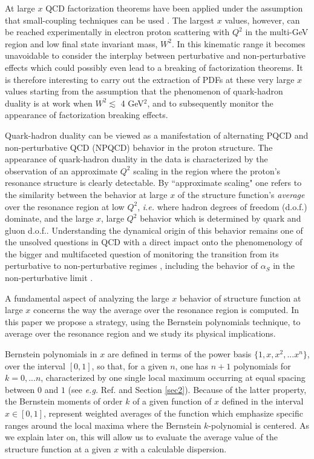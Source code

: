 \documentclass[
twocolumn,
aps,prd,
nofootinbib,
superscriptaddress,
showpacs,ligh
tightenlines, 
]{revtex4}
\begin{document}
At large $x$ QCD factorization theorems have been  applied under the assumption that 
small-coupling techniques can be used \cite{Moffat:2017sha}. The largest  $x$ values, however, can be reached experimentally in electron proton scattering with $Q^2$ in the multi-GeV region and low final state invariant mass, $W^2$. In this kinematic
range it becomes unavoidable to consider the interplay between perturbative and non-perturbative effects which could possibly even lead to a breaking of factorization theorems.  
It is therefore interesting to carry out the extraction of PDFs at these very large $x$ values starting from the
assumption that the phenomenon of quark-hadron duality is at work when $W^2 \lesssim$ 4 GeV$^2$, and to subsequently monitor the appearance of factorization breaking effects. 

Quark-hadron duality can be viewed as a manifestation of alternating
PQCD and non-perturbative QCD (NPQCD) behavior in the proton structure. 
%
The appearance of quark-hadron duality in the data is characterized by the observation of an approximate $Q^2$
scaling in the region where the proton's resonance structure is clearly detectable. By ``approximate scaling" one refers to 
the similarity between the behavior at large $x$ of the  structure function's {\it average} over the resonance region at low $Q^2$, {\it i.e.} where hadron degrees of freedom (d.o.f.) dominate, 
and the large $x$, large $Q^2$ behavior which is determined by quark and gluon d.o.f..
Understanding the dynamical origin of this behavior remains one of the unsolved questions in QCD with a direct impact onto the phenomenology of the bigger and multifaceted question of monitoring the transition from its perturbative to 
non-perturbative regimes \cite{Dokshitzer:2000yu,Dokshitzer:2005bf}, including the behavior of $\alpha_S$ in the non-perturbative limit \cite{Prosperi:2006hx,Courtoy:2013qca,Deur:2016tte}.

A fundamental aspect of analyzing the large $x$ behavior of structure function at large $x$ concerns the way the average over the resonance region is computed. 
In this paper we propose a strategy, using the Bernstein polynomials technique, to average over the resonance region and we study its physical implications. 

Bernstein polynomials in $x$ are defined in terms of the power basis $\{1, x, x^2, ...x^n\}$, over the interval  $[0,1]$, so that, for a given $n$, one has $n+1$ polynomials for $k=0,...n$, characterized by one single local maximum occurring at equal spacing between $0$ and $1$ (see {\it e.g.} Ref.\cite{Bernstein} and Section \ref{sec2}).   
Because of the latter property, the Bernstein moments of order $k$ of a given function of $x$ defined in the interval $x \in [0,1]$, represent weighted averages of the function which emphasize specific ranges around the local maxima where the Bernstein $k$-polynomial is centered. As we explain later on, this will allow us to evaluate the average value of the structure function at a given $x$ with a  calculable dispersion. 
\end{document}
